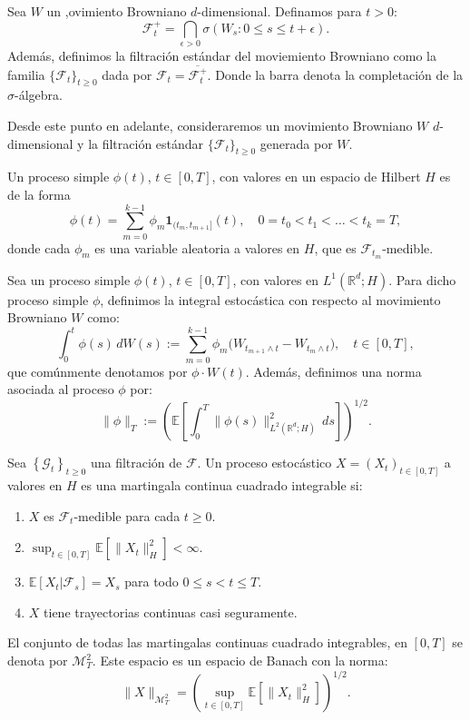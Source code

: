 \begin{defn}
  Sea $W$ un ,ovimiento Browniano $d$-dimensional. Definamos para $t >0$:
  \[
    \mathcal{F}^+_t = \bigcap_{\epsilon > 0}\sigma\left( W_s : 0 \leq s \leq t + \epsilon \right).
  \]
  Además, definimos la filtración estándar del moviemiento Browniano como la familia $\{\mathcal{F}_t\}_{t \geq 0}$ dada por $\mathcal{F}_t = \overline{\mathcal{F}^+_t}$. Donde la barra denota la completación de la $\sigma$-álgebra.
\end{defn}

Desde este punto en adelante, consideraremos un movimiento Browniano $W$ $d$-dimensional y la filtración estándar $\{\mathcal{F}_t\}_{t \geq 0}$ generada por $W$.

\begin{defn}
  Un proceso simple $\phi(t)$, $t \in [0,T]$, con valores en un espacio de Hilbert $H$ es de la forma
  \[
    \phi(t) = \sum_{m=0}^{k-1} \phi_m \mathbf{1}_{(t_m, t_{m+1}]}(t), \quad 0 = t_0 < t_1 < \ldots < t_k = T,
  \]
  donde cada $\phi_m$ es una variable aleatoria a valores en $H$, que es $\mathcal{F}_{t_m}$-medible.
\end{defn}

\begin{defn}
  Sea un proceso simple $\phi(t)$, $t \in [0,T]$, con valores en $L^1(\mathbb{R}^d; H)$. Para dicho proceso simple $\phi$, definimos la integral estocástica con respecto al movimiento Browniano $W$ como:
  \[
    \int_{0}^{t} \phi(s)\, dW(s) := \sum_{m=0}^{k-1} \phi_m\bigl(W_{t_{m+1} \wedge t} - W_{t_m \wedge t}\bigr), \quad t \in [0,T],
  \]
  que comúnmente denotamos por $\phi \cdot W(t)$. Además, definimos una norma asociada al proceso $\phi$ por:
  \[
    \|\phi\|_T := \left(\mathbb{E}\left[\int_0^T \|\phi(s)\|_{L^2(\mathbb{R}^{d}; H)}^2\, ds\right]\right)^{1/2}.
  \]
\end{defn}

\begin{defn}
  Sea $\left\{\mathcal{G}_t\right\}_{t \geq 0}$ una filtración de $\mathcal{F}$. Un proceso estocástico $X = (X_t)_{t \in [0, T]}$ a valores en $H$ es una martingala continua cuadrado integrable si:
  \begin{enumerate}
    \item $X$ es $\mathcal{F}_t$-medible para cada $t \geq 0$.
    \item $\sup_{t \in [0, T]}\mathbb{E}[\|X_t\|_H^2] < \infty$.
    \item $\mathbb{E}[X_t | \mathcal{F}_s] = X_s$ para todo $0 \leq s < t \leq T$.
    \item $X$ tiene trayectorias continuas casi seguramente.
  \end{enumerate}
  El conjunto de todas las martingalas continuas cuadrado integrables, en $[0, T]$ se denota por $\mathcal{M}_T^2$. Este espacio es un espacio de Banach con la norma:
  \[
    \|X\|_{\mathcal{M}_T^2} = \left(\sup_{t \in [0, T]}\mathbb{E}\left[\|X_t\|_H^2\right]\right)^{1/2}.
  \]
\end{defn}

